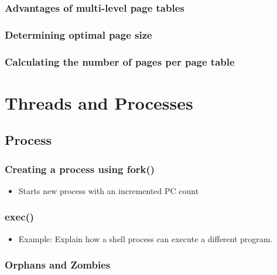 \documentclass[11pt]{article}
\begin{document}
\subsubsection{Advantages of multi-level page tables}
\label{sec-5.5.4}

\subsubsection{Determining optimal page size}
\label{sec-5.5.5}

\subsubsection{Calculating the number of pages per page table}
\label{sec-5.5.6}

\section{Threads and Processes}
\label{sec-6}

\subsection{Process}
\label{sec-6.1}

\subsubsection{Creating a process using fork()}
\label{sec-6.1.1}

\begin{itemize}
\item Starts new process with an incremented PC count
\end{itemize}
\subsubsection{exec()}
\label{sec-6.1.2}

\begin{itemize}

\item Example: Explain how a shell process can execute a different program.\\
\label{sec-6.1.2.1}

\end{itemize} %
\subsubsection{Orphans and Zombies}
\label{sec-6.1.3}
\end{document}
